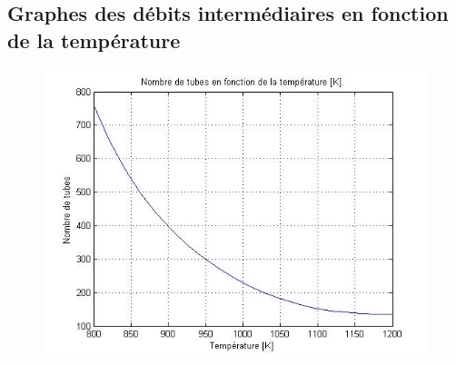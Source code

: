 \subsection{Graphes des débits intermédiaires en fonction
de la température}
\label{sec:graphes}

\begin{figure}[htb!]
	\centering
	\includegraphics[scale=0.70]{media/etude_param/useful/tubes.jpg}
\end{figure}

